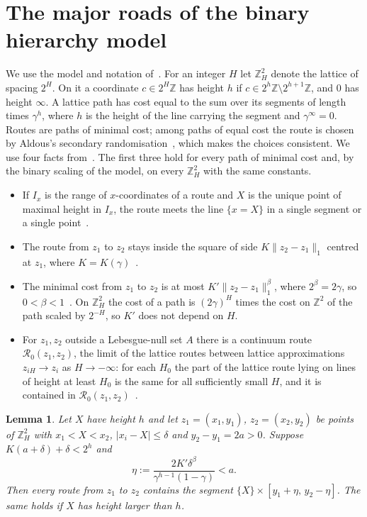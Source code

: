 \documentclass[11pt]{amsart}
\newtheorem{lemma}[theorem]{Lemma}
\theoremstyle{remark}
\newcommand{\Z}{\mathbb{Z}}
\begin{document}
\section{The major roads of the binary hierarchy model}\label{sec:roads}

We use the model and notation of~\cite[Section~3]{A14}. For an integer $H$ let $\Z^2_H$ denote the lattice of
spacing $2^H$. On it a coordinate $c\in2^H\Z$ has height $h$ if $c\in2^h\Z\setminus2^{h+1}\Z$, and $0$ has height $\infty$. A lattice path
has cost equal to the sum over its segments of length times $\gamma^{h}$, where $h$ is the height of the line carrying
the segment and $\gamma^\infty=0$. Routes are paths of minimal cost; among paths of equal cost the route is chosen by
Aldous's secondary randomisation~\cite[Section~3.4]{A14}, which makes the choices consistent. We use four facts
from~\cite[Section~3]{A14}. The first three hold for every path of minimal cost and, by the binary scaling of the
model, on every $\Z^2_H$ with the same constants.
\begin{itemize}
\item[(F1)] If $I_x$ is the range of $x$-coordinates of a route and $X$ is the unique point of maximal height in
$I_x$, the route meets the line $\{x=X\}$ in a single segment or a single point~\cite[Lemma~3.2(ii)]{A14}.
\item[(F2)] The route from $z_1$ to $z_2$ stays inside the square of side $K\|z_2-z_1\|_1$ centred at $z_1$, where
$K=K(\gamma)$~\cite[Lemma~3.3]{A14}.
\item[(F3)] The minimal cost from $z_1$ to $z_2$ is at most $K'\|z_2-z_1\|_1^\beta$, where $2^\beta=2\gamma$, so
$0<\beta<1$~\cite[Lemma~3.7]{A14}. On $\Z^2_H$ the cost of a path is $(2\gamma)^{H}$ times the cost on $\Z^2$ of the
path scaled by $2^{-H}$, so $K'$ does not depend on $H$.
\item[(F4)] For $z_1,z_2$ outside a Lebesgue-null set $A$ there is a continuum route $\mathcal R_0(z_1,z_2)$, the limit
of the lattice routes between lattice approximations $z_{iH}\to z_i$ as $H\to-\infty$: for each $H_0$ the part of
the lattice route lying on lines of height at least $H_0$ is the same for all sufficiently small $H$, and it is
contained in $\mathcal R_0(z_1,z_2)$~\cite[Proposition~3.8]{A14}.
\end{itemize}

\begin{lemma}\label{lem:straddle}
Let $X$ have height $h$ and let $z_1=(x_1,y_1)$, $z_2=(x_2,y_2)$ be points of $\Z^2_H$ with $x_1<X<x_2$,
$|x_i-X|\le\delta$ and $y_2-y_1=2a>0$. Suppose $K(a+\delta)+\delta<2^h$ and
\[
\eta:=\frac{2K'\delta^\beta}{\gamma^{h-1}(1-\gamma)}<a .
\]
Then every route from $z_1$ to $z_2$ contains the segment $\{X\}\times[y_1+\eta,\,y_2-\eta]$. The same holds if $X$
has height larger than $h$.
\end{lemma}
\end{document}
